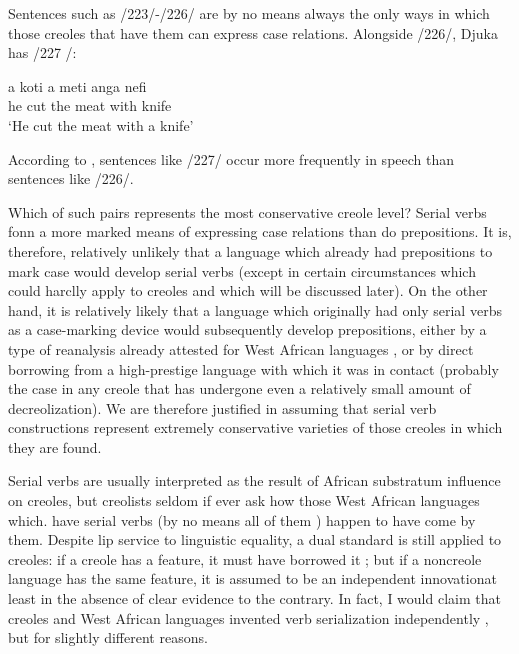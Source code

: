 Sentences such as /223/-/226/ are by no means always the only ways in which those creoles that have them can express case relations. Alongside /226/, Djuka has /227 /:

\ea\label{ex:2:227}
\gll a koti a meti anga nefi\\
he cut the meat with knife\\
\glt `He cut the meat with a knife'
\z




According to \citet{Huttar1975}, sentences like /227/ occur more fre\-quently in speech than sentences like /226/.

Which of such pairs represents the most conservative creole
level? Serial verbs fonn a more marked means of expressing case rela\-tions than do prepositions. It is, therefore, relatively unlikely that a language which already had prepositions to mark case would develop serial verbs (except in certain circumstances which could harclly apply
to creoles and which will be discussed later). On the other hand, it is
relatively likely that a language which originally had only serial verbs as a case-marking device would subsequently develop prepositions, either by a type of reanalysis already attested for West African lan\-guages \citep{Lord1976}, or by direct borrowing from a high-prestige lan\-guage with which it was in contact (probably the case in any creole
that has undergone even a relatively small amount of decreolization). We are therefore justified in assuming that serial verb constructions represent extremely conservative varieties of those creoles in which they are found.

Serial verbs are usually interpreted as the result of African substratum influence on creoles, but creolists seldom if ever ask how those West African languages which. have serial verbs (by no means all of them ) happen to have come by them. Despite lip service to linguistic equality, a dual standard is still applied to creoles: if a creole has a feature, it must have borrowed it ; but if a noncreole language has the same feature, it is assumed to be an independent innovation\-at least in the absence of clear evidence to the contrary. In fact, I would claim that creoles and West African languages invented verb serialization independently , but for slightly different reasons.

